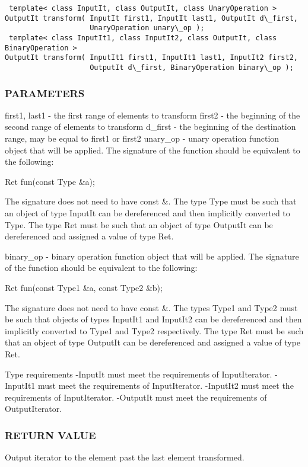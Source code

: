 \begin{lstlisting}
 template< class InputIt, class OutputIt, class UnaryOperation >
OutputIt transform( InputIt first1, InputIt last1, OutputIt d\_first,
                    UnaryOperation unary\_op );
 template< class InputIt1, class InputIt2, class OutputIt, class BinaryOperation >
OutputIt transform( InputIt1 first1, InputIt1 last1, InputIt2 first2,
                    OutputIt d\_first, BinaryOperation binary\_op );
\end{lstlisting}

\subsubsection{PARAMETERS}
first1, last1 - the first range of elements to transform
first2 - the beginning of the second range of elements to transform
d\_first - the beginning of the destination range, may be equal to first1 or first2
unary\_op - unary operation function object that will be applied.
The signature of the function should be equivalent to the following:

 Ret fun(const Type \&a);

The signature does not need to have const \&. The type Type must be such that an object of type InputIt can be dereferenced and then implicitly converted to Type. The type Ret must be such that an object of type OutputIt can be dereferenced and assigned a value of type Ret.

binary\_op - binary operation function object that will be applied.
The signature of the function should be equivalent to the following:

 Ret fun(const Type1 \&a, const Type2 \&b);

The signature does not need to have const \&. The types Type1 and Type2 must be such that objects of types InputIt1 and InputIt2 can be dereferenced and then implicitly converted to Type1 and Type2 respectively. The type Ret must be such that an object of type OutputIt can be dereferenced and assigned a value of type Ret.

 Type requirements
 -InputIt must meet the requirements of InputIterator.
 -InputIt1 must meet the requirements of InputIterator.
 -InputIt2 must meet the requirements of InputIterator.
 -OutputIt must meet the requirements of OutputIterator.

\subsubsection{RETURN VALUE}
Output iterator to the element past the last element transformed.



